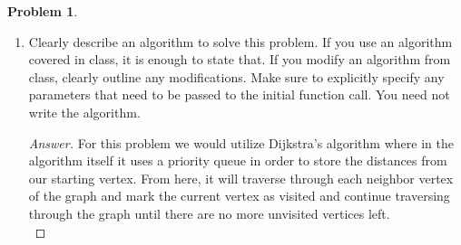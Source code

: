 \documentclass[11pt]{article}
\theoremstyle{definition}
\theoremstyle{definition}
\newtheorem{required}{Problem}
\theoremstyle{definition}
\begin{document}
\begin{required}
\begin{enumerate}[label=(\alph*)]
\begin{proof}[Answer]
This problem can be rephrased into a graph problem by the following: \\
\begin{center}
The state of the batteries who's capacities are 40Ah, 25Ah, 16Ah represent the vertices in the graph. \\
The edges between the vertices within the graph represent the transfer of battery in Ah. \\
The edge weights of the edges represent the amount of battery in Ah that is being transferred to another battery and how much money we would spend. \\
\end{center}
Note: If two vertices are adjacent within the graph it represents that a transfer will occur within the graph. \\

The question for this graph would be from the Problem description, how would we be able to leave 10 Ah in either the 25 Ah or the 16 Ah battery while also using the least amount of money possible to achieve this. This would be a clear indication to use Dijkstra's algorithm as it is designed to find the shortest path possible, but in this case the shortest path would represent how little money we would use, thus the SSSPT would be a tree where we would use the least amount of money possible while also achieving our goal.
	
\end{proof}

	\newpage
	\subsubsection{Problem 2\ref{Dijkstra2b}}
	\item \label{Dijkstra2b} Clearly describe an algorithm to solve this problem. If you use an algorithm covered in class, it is enough to state that. If you modify an algorithm from class, clearly outline any modifications. Make sure to explicitly specify any parameters that need to be passed to the initial function call. You need not write the algorithm.
	
\begin{proof}[Answer]
For this problem we would utilize Dijkstra's algorithm where in the algorithm itself it uses a priority queue in order to store the distances from our starting vertex. From here, it will traverse through each neighbor vertex of the graph and mark the current vertex as visited and continue traversing through the graph until there are no more unvisited vertices left. \\


\end{proof}
\end{enumerate}
\end{required}
\end{document}
